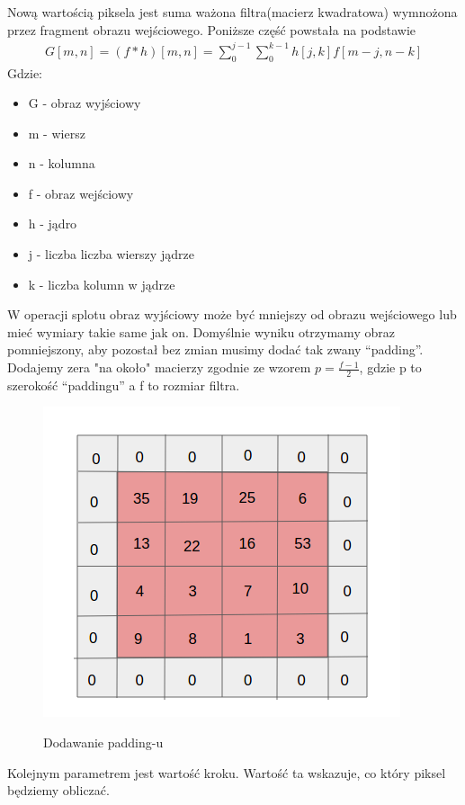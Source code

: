 \documentclass{article}
\begin{document}
Nową wartością piksela jest suma ważona filtra(macierz kwadratowa) wymnożona przez fragment obrazu wejściowego.
Poniższe część powstała na podstawie \cite{convolution-math}
\begin{align*}
    G[m,n] = (f*h)[m,n] = \sum_0^{j-1}\sum_0^{k-1} h[j,k]f[m-j,n-k]
\end{align*}
Gdzie:
\begin{itemize}
    \item G - obraz wyjściowy
    \item m - wiersz
    \item n - kolumna
    \item f - obraz wejściowy
    \item h - jądro
    \item j - liczba liczba wierszy jądrze
    \item k - liczba kolumn w jądrze
\end{itemize}
W operacji splotu obraz wyjściowy może być mniejszy od obrazu wejściowego lub mieć wymiary takie same jak on.
Domyślnie wyniku otrzymamy obraz pomniejszony, aby pozostał bez zmian musimy dodać tak zwany ``padding''.
Dodajemy zera "na około" macierzy zgodnie ze wzorem $p = \frac{f-1}{2}$, gdzie p to szerokość ``paddingu'' a f to rozmiar filtra.
\begin{figure}[H]
    \centering
    \includegraphics[width=\linewidth]{images/padding.png}
    \caption{Dodawanie padding-u}
    \cite{padding}
\end{figure}
Kolejnym parametrem jest wartość kroku. Wartość ta wskazuje, co który piksel będziemy obliczać.
\end{document}
